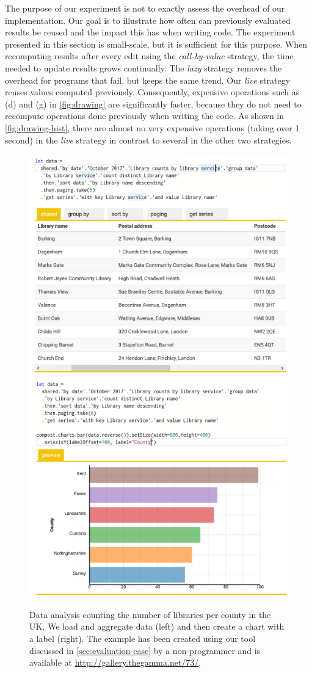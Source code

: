 \documentclass[english,crc,references=cleveref]{programming}
\theoremstyle{plain}
\theoremstyle{definition}
\begin{document}
The purpose of our experiment is not to exactly assess the overhead of our implementation.
Our goal is to illustrate how often can previously evaluated results be reused and the impact
this has when writing code. The experiment presented in this section is small-scale, but it is
sufficient for this purpose. When recomputing results after every edit
using the \emph{call-by-value} strategy, the time needed to update results grows
continually. The \emph{lazy} strategy removes the overhead for programs that fail, but
keeps the same trend. Our \emph{live} strategy reuses values computed
previously. Consequently, expensive operations such as (d) and (g) in \cref{fig:drawing}
are significantly faster, because they do not need to recompute operations done previously when
writing the code. As shown in \cref{fig:drawing-hist}, there are almost no very expensive
operations (taking over 1 second) in the \emph{live} strategy in contrast to several in the
other two strategies.


\begin{figure}
  \begin{wide}
\includegraphics[width=.5\linewidth]{figures/gallery1.png}
\includegraphics[width=.5\linewidth]{figures/gallery2.png}
\end{wide}
\caption{Data analysis counting the number of libraries per county in the UK. We load
  and aggregate data (left) and then create a chart with a label (right).
  The example has been created using our tool discussed in \cref{sec:evaluation-case}
  by a non-programmer and is available at \url{http://gallery.thegamma.net/73/}.}
\label{fig:gallery}
%
\end{figure}
\end{document}
